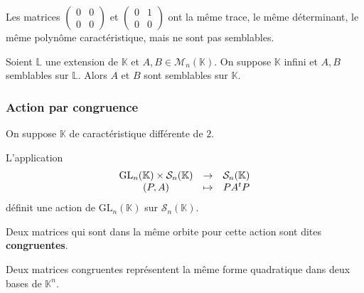 
  \begin{cexample}
    Les matrices $\begin{pmatrix} 0 & 0 \\ 0 & 0\end{pmatrix}$ et $\begin{pmatrix} 0 & 1 \\ 0 & 0\end{pmatrix}$ ont la même trace, le même déterminant, le même polynôme caractéristique, mais ne sont pas semblables.
  \end{cexample}


  \begin{theorem}
    Soient $\mathbb{L}$ une extension de $\mathbb{K}$ et $A, B \in \mathcal{M}_n(\mathbb{K})$. On suppose $\mathbb{K}$ infini et $A, B$  semblables sur $\mathbb{L}$. Alors $A$ et $B$ sont semblables sur $\mathbb{K}$.
  \end{theorem}

  \subsubsection{Action par congruence}


  On suppose $\mathbb{K}$ de caractéristique différente de $2$.

  \begin{proposition}
    L'application
    \[
    \begin{array}{ccc}
      \mathrm{GL}_n(\mathbb{K}) \times \mathcal{S}_n(\mathbb{K}) &\rightarrow& \mathcal{S}_n(\mathbb{K}) \\
      (P, A) &\mapsto& PA\mathstrut ^t P
    \end{array}
    \]
    définit une action de $\mathrm{GL}_n(\mathbb{K})$ sur $\mathcal{S}_n(\mathbb{K})$.
  \end{proposition}

  \begin{definition}
    Deux matrices qui sont dans la même orbite pour cette action sont dites \textbf{congruentes}.
  \end{definition}

  \begin{remark}
    Deux matrices congruentes représentent la même forme quadratique dans deux bases de $\mathbb{K}^n$.
  \end{remark}

